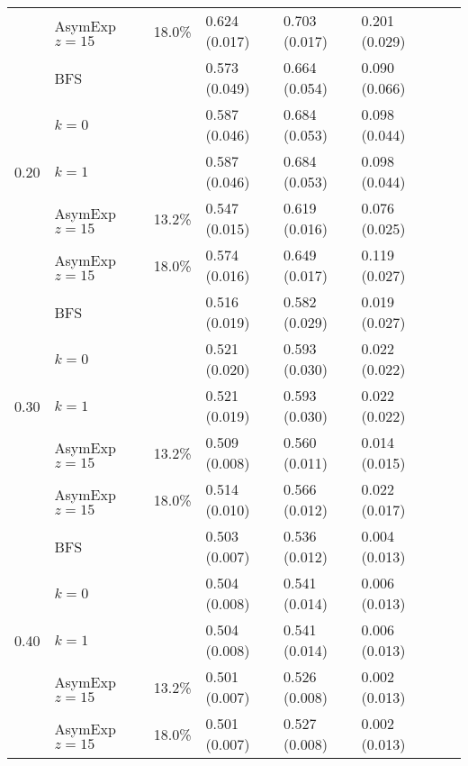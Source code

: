 \documentclass[a4paper,final,notitlepage,11pt,svgnames]{scrartcl}
\begin{document}
\begin{table}[htpb]
\begin{tabular}{llllllll}
		                      & AsymExp $z=15$ & 18.0\%       & 0.624 (0.017) & 0.703 (0.017) & 0.201 (0.029) &              & \\
		\cmidrule(r){2-6}
		\multirow{5}{*}{0.20} & BFS            &              & 0.573 (0.049) & 0.664 (0.054) & 0.090 (0.066) &              & \\
		                      & $k=0$          &              & 0.587 (0.046) & 0.684 (0.053) & 0.098 (0.044) &              & \\
		                      & $k=1$          &              & 0.587 (0.046) & 0.684 (0.053) & 0.098 (0.044) &              & \\
		                      & AsymExp $z=15$ & 13.2\%       & 0.547 (0.015) & 0.619 (0.016) & 0.076 (0.025) &              & \\
		                      & AsymExp $z=15$ & 18.0\%       & 0.574 (0.016) & 0.649 (0.017) & 0.119 (0.027) &              & \\
		\cmidrule(r){2-6}
		\multirow{5}{*}{0.30} & BFS            &              & 0.516 (0.019) & 0.582 (0.029) & 0.019 (0.027) &              & \\
		                      & $k=0$          &              & 0.521 (0.020) & 0.593 (0.030) & 0.022 (0.022) &              & \\
		                      & $k=1$          &              & 0.521 (0.019) & 0.593 (0.030) & 0.022 (0.022) &              & \\
		                      & AsymExp $z=15$ & 13.2\%       & 0.509 (0.008) & 0.560 (0.011) & 0.014 (0.015) &              & \\
		                      & AsymExp $z=15$ & 18.0\%       & 0.514 (0.010) & 0.566 (0.012) & 0.022 (0.017) &              & \\
		\cmidrule(r){2-6}
		\multirow{5}{*}{0.40} & BFS            &              & 0.503 (0.007) & 0.536 (0.012) & 0.004 (0.013) &              & \\
		                      & $k=0$          &              & 0.504 (0.008) & 0.541 (0.014) & 0.006 (0.013) &              & \\
		                      & $k=1$          &              & 0.504 (0.008) & 0.541 (0.014) & 0.006 (0.013) &              & \\
		                      & AsymExp $z=15$ & 13.2\%       & 0.501 (0.007) & 0.526 (0.008) & 0.002 (0.013) &              & \\
		                      & AsymExp $z=15$ & 18.0\%       & 0.501 (0.007) & 0.527 (0.008) & 0.002 (0.013) &              & \\
		\bottomrule
		\end{tabular}
\end{table}
\end{document}
